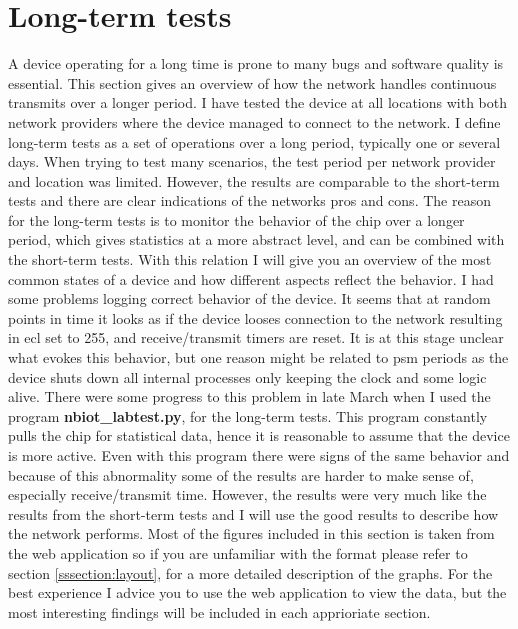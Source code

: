 \documentclass[USenglish]{ifimaster}  %
\begin{document}
\section{Long-term tests} \label{section:longtermtest}
A device operating for a long time is prone to many bugs and software quality is essential. This section gives an overview of how the network handles continuous transmits over a longer period. I have tested the device at all locations with both network providers where the device managed to connect to the network. I define long-term tests as a set of operations over a long period, typically one or several days. When trying to test many scenarios, the test period per network provider and location was limited. However, the results are comparable to the short-term tests and there are clear indications of the networks pros and cons. The reason for the long-term tests is to monitor the behavior of the chip over a longer period, which gives statistics at a more abstract level, and can be combined with the short-term tests. With this relation I will give you an overview of the most common states of a device and how different aspects reflect the behavior. I had some problems logging correct behavior of the device. It seems that at random points in time it looks as if the device looses connection to the network resulting in \acrshort{ecl} set to 255, and receive/transmit timers are reset. It is at this stage unclear what evokes this behavior, but one reason might be related to \acrshort{psm} periods as the device shuts down all internal processes only keeping the clock and some logic alive. There were some progress to this problem in late March when I used the program \textbf{nbiot\_labtest.py}, for the long-term tests. This program constantly pulls the chip for statistical data, hence it is reasonable to assume that the device is more active. Even with this program there were signs of the same behavior and because of this abnormality some of the results are harder to make sense of, especially receive/transmit time. However, the results were very much like the results from the short-term tests and I will use the good results to describe how the network performs. Most of the figures included in this section is taken from the web application so if you are unfamiliar with the format please refer to section \vref{sssection:layout}, for a more detailed description of the graphs. For the best experience I advice you to use the web application to view the data, but the most interesting findings will be included in each apprioriate section.
\end{document}
